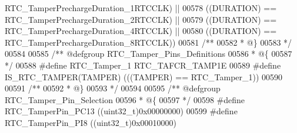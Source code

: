 \begin{DoxyCode}
      RTC_TamperPrechargeDuration_1RTCCLK\textcolor{preprocessor}{)} \textcolor{preprocessor}{||}
00578                                                     \textcolor{preprocessor}{(}\textcolor{preprocessor}{(}\textcolor{preprocessor}{DURATION}\textcolor{preprocessor}{)} \textcolor{preprocessor}{==} 
      RTC_TamperPrechargeDuration_2RTCCLK\textcolor{preprocessor}{)} \textcolor{preprocessor}{||}
00579                                                     \textcolor{preprocessor}{(}\textcolor{preprocessor}{(}\textcolor{preprocessor}{DURATION}\textcolor{preprocessor}{)} \textcolor{preprocessor}{==} 
      RTC_TamperPrechargeDuration_4RTCCLK\textcolor{preprocessor}{)} \textcolor{preprocessor}{||}
00580                                                     \textcolor{preprocessor}{(}\textcolor{preprocessor}{(}\textcolor{preprocessor}{DURATION}\textcolor{preprocessor}{)} \textcolor{preprocessor}{==} 
      RTC_TamperPrechargeDuration_8RTCCLK\textcolor{preprocessor}{)}\textcolor{preprocessor}{)}
00581 \textcolor{comment}{/**}
00582 \textcolor{comment}{  * @\}}
00583 \textcolor{comment}{  */}
00584 
00585 \textcolor{comment}{/** @defgroup RTC\_Tamper\_Pins\_Definitions }
00586 \textcolor{comment}{  * @\{}
00587 \textcolor{comment}{  */}
00588 \textcolor{preprocessor}{#}\textcolor{preprocessor}{define} \textcolor{preprocessor}{RTC\_Tamper\_1}                    RTC_TAFCR_TAMP1E
00589 \textcolor{preprocessor}{#}\textcolor{preprocessor}{define} \textcolor{preprocessor}{IS\_RTC\_TAMPER}\textcolor{preprocessor}{(}\textcolor{preprocessor}{TAMPER}\textcolor{preprocessor}{)} \textcolor{preprocessor}{(}\textcolor{preprocessor}{(}\textcolor{preprocessor}{(}\textcolor{preprocessor}{TAMPER}\textcolor{preprocessor}{)} \textcolor{preprocessor}{==} RTC_Tamper_1\textcolor{preprocessor}{)}\textcolor{preprocessor}{)}
00590 
00591 \textcolor{comment}{/**}
00592 \textcolor{comment}{  * @\}}
00593 \textcolor{comment}{  */}
00594 
00595 \textcolor{comment}{/** @defgroup RTC\_Tamper\_Pin\_Selection }
00596 \textcolor{comment}{  * @\{}
00597 \textcolor{comment}{  */}
00598 \textcolor{preprocessor}{#}\textcolor{preprocessor}{define} \textcolor{preprocessor}{RTC\_TamperPin\_PC13}                 \textcolor{preprocessor}{(}\textcolor{preprocessor}{(}\textcolor{preprocessor}{uint32\_t}\textcolor{preprocessor}{)}0x00000000\textcolor{preprocessor}{)}
00599 \textcolor{preprocessor}{#}\textcolor{preprocessor}{define} \textcolor{preprocessor}{RTC\_TamperPin\_PI8}                  \textcolor{preprocessor}{(}\textcolor{preprocessor}{(}\textcolor{preprocessor}{uint32\_t}\textcolor{preprocessor}{)}0x00010000\textcolor{preprocessor}{)}

\end{DoxyCode}
